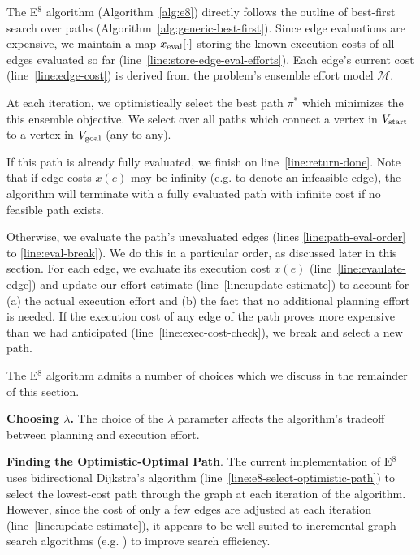 The E$^8$ algorithm (Algorithm~\ref{alg:e8})
directly follows the outline
of best-first search over paths
(Algorithm~\ref{alg:generic-best-first}).
Since edge evaluations are expensive,
we maintain a map $x_{\mbox{\scriptsize eval}}[\cdot]$
storing the known execution costs of all edges evaluated so far
(line~\ref{line:store-edge-eval-efforts}).
Each edge's current cost (line~\ref{line:edge-cost})
is derived from the problem's ensemble effort model $\mathcal{M}$.

At each iteration,
we optimistically select the best path $\pi^*$
which minimizes the this ensemble objective.
We select over all paths which connect
a vertex in $V_{\mbox{\scriptsize start}}$
to a vertex in $V_{\mbox{\scriptsize goal}}$
(any-to-any).

If this path is already fully evaluated,
we finish on line~\ref{line:return-done}.
Note that if edge costs $x(e)$ may be infinity
(e.g. to denote an infeasible edge),
the algorithm will terminate with a fully evaluated path
with infinite cost if no feasible path exists.

Otherwise,
we evaluate the path's unevaluated edges
(lines \ref{line:path-eval-order}
to \ref{line:eval-break}).
We do this in a particular order,
as discussed later in this section.
For each edge,
we evaluate its execution cost $x(e)$ (line~\ref{line:evaulate-edge})
and update our effort estimate (line~\ref{line:update-estimate})
to account for (a) the actual execution effort
and (b) the fact that no additional planning effort is needed.
If the execution cost of any edge of the path proves
more expensive than we had anticipated
(line~\ref{line:exec-cost-check}),
we break and select a new path.

The E$^8$ algorithm admits a number of choices
which we discuss in the remainder of this section.

\textbf{Choosing $\lambda$.}
The choice of the $\lambda$ parameter
affects the algorithm's tradeoff between planning and execution effort.

\textbf{Finding the Optimistic-Optimal Path}.
The current implementation of E$^8$ uses
bidirectional Dijkstra's algorithm
(line~\ref{line:e8-select-optimistic-path})
to select the lowest-cost path through the graph
at each iteration of the algorithm.
However, since the cost of only a few edges
are adjusted at each iteration (line~\ref{line:update-estimate}),
it appears to be well-suited to incremental
graph search algorithms (e.g. \citep{koenig2004lpastar})
to improve search efficiency.

